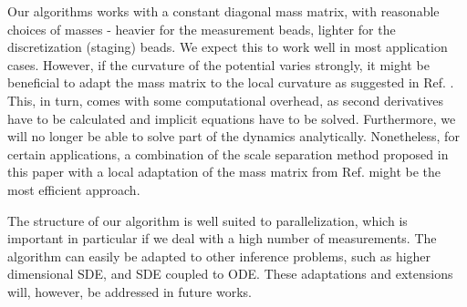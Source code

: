 \documentclass[11pt]{article}
\theoremstyle{definition}
\begin{document}
Our algorithms works with a constant diagonal mass matrix, with reasonable choices of masses - heavier for the measurement beads, lighter for the discretization (staging) beads.
We expect this to work well in most application cases.
However, if the curvature of the potential varies strongly, it might be beneficial to adapt the mass matrix to the local curvature as suggested in Ref. \cite{girolami_2011_HMC}.
This, in turn, comes with some computational overhead, as second derivatives have to be calculated and implicit equations have to be solved.
Furthermore, we will no longer be able to solve part of the dynamics analytically.
Nonetheless, for certain applications, a combination of the scale separation method proposed in this paper with a local adaptation of the mass matrix from Ref. \cite{girolami_2011_HMC} might  be the most efficient approach.


The structure of our algorithm is well suited to parallelization, which is important in particular if we deal with a high number of measurements. The algorithm can easily be adapted to other inference problems, such as higher dimensional SDE, and SDE coupled to ODE. These adaptations and extensions will, however, be addressed in future works.



%
\end{document}
